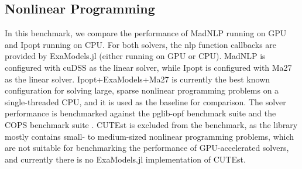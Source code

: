 \documentclass{article}
\begin{document}
\begin{table}[t]
\begin{tabular}{|c|c|cc|cc|cc|cc|}
  \hline
\end{tabular}
\end{table}

\subsection{Nonlinear Programming}
In this benchmark, we compare the performance of MadNLP running on GPU and Ipopt running on CPU. For both solvers, the \gls*{nlp} function callbacks are provided by ExaModels.jl (either running on GPU or CPU). MadNLP is configured with cuDSS as the linear solver, while Ipopt is configured with Ma27 as the linear solver. Ipopt+ExaModels+Ma27 is currently the best known configuration for solving large, sparse nonlinear programming problems on a single-threaded CPU, and it is used as the baseline for comparison. The solver performance is benchmarked against the pglib-opf benchmark suite \cite{} and the COPS benchmark suite \cite{}. CUTEst \cite{} is excluded from the benchmark, as the library mostly contains small- to medium-sized nonlinear programming problems, which are not suitable for benchmarking the performance of GPU-accelerated solvers, and currently there is no ExaModels.jl implementation of CUTEst.
\end{document}
